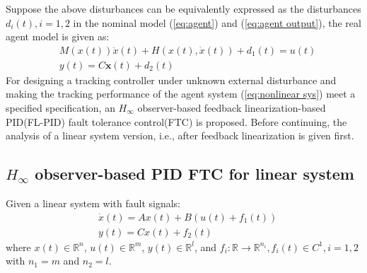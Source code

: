 \documentclass{ieeeaccess}
\begin{document}
Suppose the above disturbances can be equivalently expressed as the disturbances $d_i(t), i=1,2$ in the nominal model (\ref{eq:agent}) and (\ref{eq:agent output}), the real agent model is given as:
\begin{equation} \label{eq:nonlinear sys} 
    \begin{split}
        & M(x(t))\ddot{x}(t) + H(x(t),\dot{x}(t)) + d_1(t) = u(t)\\
        & y(t) = C\pmb{x}(t) + d_2(t)
    \end{split}
\end{equation}
For designing a tracking controller under unknown external disturbance and making the tracking performance of the agent system (\ref{eq:nonlinear sys}) meet a specified specification, an $H_\infty$ observer-based feedback linearization-based PID(FL-PID) fault tolerance control(FTC) is proposed. Before continuing, the analysis of a linear system version, i.e., after feedback linearization is given first.

\subsection{$H_\infty$ observer-based PID FTC for linear system}
Given a linear system with fault signals:
\begin{equation} \label{eq:4}
    \begin{split}
        & \dot{x}(t)=Ax(t)+B(u(t)+f_1(t)) \\
        & y(t)=Cx(t)+f_2(t)   
    \end{split}  
\end{equation}
where $x(t)\in\mathbb{R}^n$, $u(t)\in\mathbb{R}^m$, $y(t)\in\mathbb{R}^l$, and $f_i:\mathbb{R}\rightarrow \mathbb{R}^{n_i}, f_i(t)\in C^{1}, i=1,2$ with $n_1=m$ and $n_2 = l$.
\end{document}
